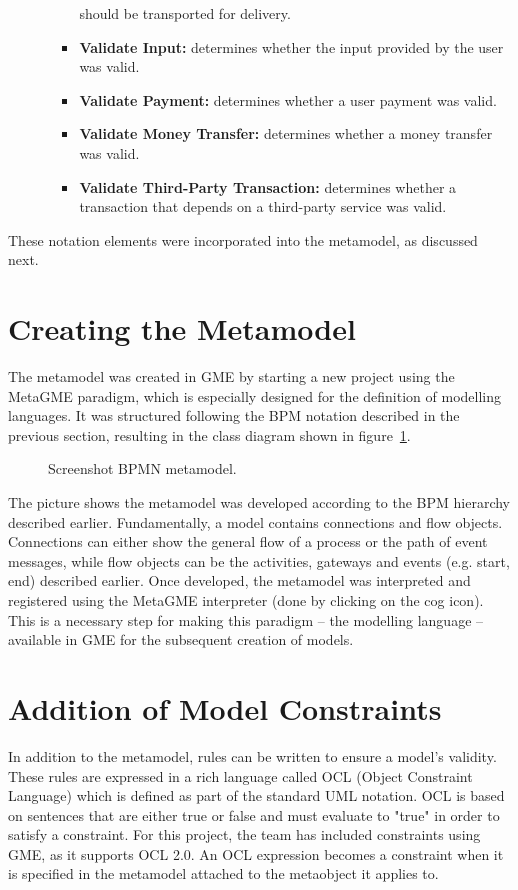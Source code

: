 \documentclass[11pt, a4paper, oneside, openright]{article}
\begin{document}
\begin{itemize}
\begin{itemize}
\begin{itemize}
      should be transported for delivery.
      \item \textbf{Validate Input:} determines whether the input provided by
      the user was valid.
      \item \textbf{Validate Payment:} determines whether a user payment was
      valid.
      \item \textbf{Validate Money Transfer:} determines whether a money
      transfer was valid.
      \item \textbf{Validate Third-Party Transaction:} determines whether a
      transaction that depends on a third-party service was valid.
    \end{itemize}
  \end{itemize}
\end{itemize}

These notation elements were incorporated into the metamodel, as discussed next.

\section{Creating the Metamodel}
The metamodel was created in GME by starting a new project using the MetaGME
paradigm, which is especially designed for the definition of modelling
languages. It was structured following the BPM notation described in the
previous section, resulting in the class diagram shown in figure~\ref{fig:metamodel}.

\begin{figure}[!ht]
\centerline{}
\caption{Screenshot BPMN metamodel.}
\label{fig:metamodel}
\end{figure}

The picture shows the metamodel was developed according to the BPM hierarchy
described earlier. Fundamentally, a model contains connections and flow objects.
Connections can either show the general flow of a process or the path of event
messages, while flow objects can be the activities, gateways and events (e.g.
start, end) described earlier. Once developed, the metamodel was interpreted and
registered using the MetaGME interpreter (done by clicking on the cog icon).
This is a necessary step for making this paradigm -- the modelling language --
available in GME for the subsequent creation of models.

\section{Addition of Model Constraints}
In addition to the metamodel, rules can be written to ensure a model's validity.
These rules are expressed in a rich language called OCL (Object Constraint
Language) which is defined as part of the standard UML notation. OCL is based on
sentences that are either true or false and must evaluate to "true" in order to
satisfy a constraint. For this project, the team has included constraints using
GME, as it supports OCL 2.0. An OCL expression becomes a constraint when it is
specified in the metamodel attached to the metaobject it applies to.
\end{document}
